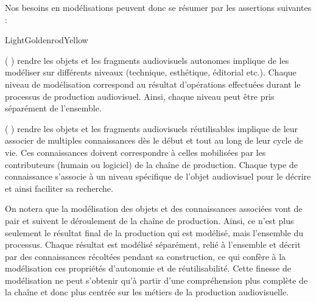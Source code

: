 Nos besoins en modélisations peuvent donc se résumer par les assertions suivantes : 
\begin{problemes}{LightGoldenrodYellow}
\begin{liste}
	\item[(\e{$\chi_1$}]) rendre les objets et les fragments audiovisuels autonomes implique de les modéliser sur différents niveaux (technique, esthétique, éditorial etc.). 
	Chaque niveau de modélisation correspond au résultat d'opérations effectuées durant le processus de production audiovisuel.
	Ainsi, chaque niveau peut être pris séparément de l'ensemble.

	\item[(\e{$\chi_2$}]) rendre les objets et les fragments audiovisuels réutilisables implique de leur associer de multiples connaissances dès le début et tout au long de leur cycle de vie.
	Ces connaissances doivent correspondre à celles mobilisées par les contributeurs (humain ou logiciel) de la chaîne de production.
	Chaque type de connaissance s'associe à un niveau spécifique de l'objet audiovisuel pour le décrire et ainsi faciliter sa recherche.
\end{liste}
\end{problemes}
On notera que la modélisation des objets et des connaissances associées vont de pair et suivent le déroulement de la chaîne de production.
Ainsi, ce n'est plus seulement le résultat final de la production qui est modélisé, mais l'ensemble du processus.
Chaque résultat est modélisé séparément, relié à l'ensemble et décrit par des connaissances récoltées pendant sa construction, ce qui confère à la modélisation ces propriétés d'autonomie et de réutilisabilité.
Cette finesse de modélisation ne peut s'obtenir qu'à partir d'une compréhension plus complète de la chaîne et donc plus centrée sur les métiers de la production audiovisuelle. 